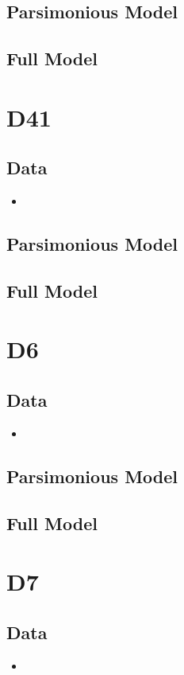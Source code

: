\documentclass[12pt]{amsart}
\begin{document}
\subsection{Parsimonious Model}

\subsection{Full Model}

\section{D41}
\subsection{Data}
\begin{itemize}
\item
\end{itemize}
\subsection{Parsimonious Model}

\subsection{Full Model}

\section{D6}
\subsection{Data}
\begin{itemize}
\item
\end{itemize}
\subsection{Parsimonious Model}

\subsection{Full Model}

\section{D7}
\subsection{Data}
\begin{itemize}
\item
\end{itemize}
\end{document}
